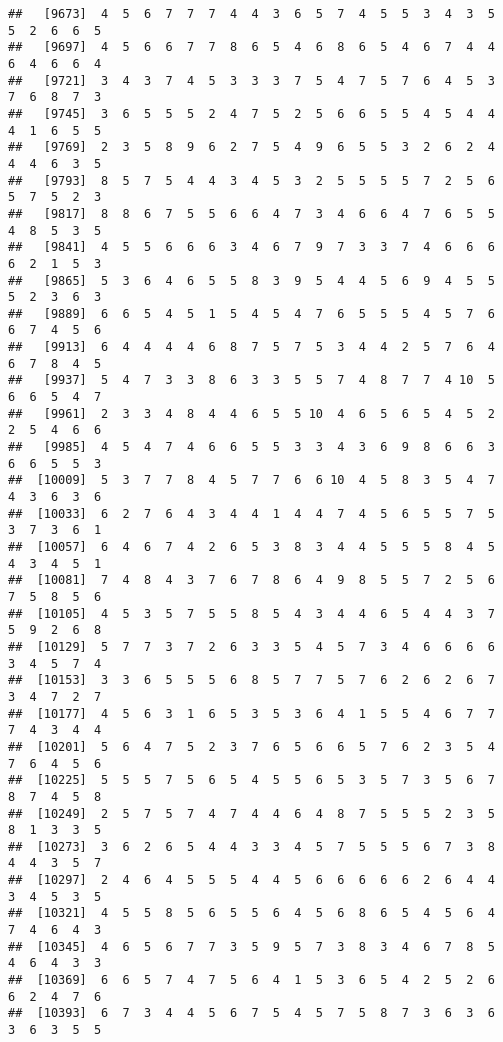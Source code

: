 \documentclass[
]{book}
\begin{document}
\begin{verbatim}
##   [9673]  4  5  6  7  7  7  4  4  3  6  5  7  4  5  5  3  4  3  5  5  2  6  6  5
##   [9697]  4  5  6  6  7  7  8  6  5  4  6  8  6  5  4  6  7  4  4  6  4  6  6  4
##   [9721]  3  4  3  7  4  5  3  3  3  7  5  4  7  5  7  6  4  5  3  7  6  8  7  3
##   [9745]  3  6  5  5  5  2  4  7  5  2  5  6  6  5  5  4  5  4  4  4  1  6  5  5
##   [9769]  2  3  5  8  9  6  2  7  5  4  9  6  5  5  3  2  6  2  4  4  4  6  3  5
##   [9793]  8  5  7  5  4  4  3  4  5  3  2  5  5  5  5  7  2  5  6  5  7  5  2  3
##   [9817]  8  8  6  7  5  5  6  6  4  7  3  4  6  6  4  7  6  5  5  4  8  5  3  5
##   [9841]  4  5  5  6  6  6  3  4  6  7  9  7  3  3  7  4  6  6  6  6  2  1  5  3
##   [9865]  5  3  6  4  6  5  5  8  3  9  5  4  4  5  6  9  4  5  5  5  2  3  6  3
##   [9889]  6  6  5  4  5  1  5  4  5  4  7  6  5  5  5  4  5  7  6  6  7  4  5  6
##   [9913]  6  4  4  4  4  6  8  7  5  7  5  3  4  4  2  5  7  6  4  6  7  8  4  5
##   [9937]  5  4  7  3  3  8  6  3  3  5  5  7  4  8  7  7  4 10  5  6  6  5  4  7
##   [9961]  2  3  3  4  8  4  4  6  5  5 10  4  6  5  6  5  4  5  2  2  5  4  6  6
##   [9985]  4  5  4  7  4  6  6  5  5  3  3  4  3  6  9  8  6  6  3  6  6  5  5  3
##  [10009]  5  3  7  7  8  4  5  7  7  6  6 10  4  5  8  3  5  4  7  4  3  6  3  6
##  [10033]  6  2  7  6  4  3  4  4  1  4  4  7  4  5  6  5  5  7  5  3  7  3  6  1
##  [10057]  6  4  6  7  4  2  6  5  3  8  3  4  4  5  5  5  8  4  5  4  3  4  5  1
##  [10081]  7  4  8  4  3  7  6  7  8  6  4  9  8  5  5  7  2  5  6  7  5  8  5  6
##  [10105]  4  5  3  5  7  5  5  8  5  4  3  4  4  6  5  4  4  3  7  5  9  2  6  8
##  [10129]  5  7  7  3  7  2  6  3  3  5  4  5  7  3  4  6  6  6  6  3  4  5  7  4
##  [10153]  3  3  6  5  5  5  6  8  5  7  7  5  7  6  2  6  2  6  7  3  4  7  2  7
##  [10177]  4  5  6  3  1  6  5  3  5  3  6  4  1  5  5  4  6  7  7  7  4  3  4  4
##  [10201]  5  6  4  7  5  2  3  7  6  5  6  6  5  7  6  2  3  5  4  7  6  4  5  6
##  [10225]  5  5  5  7  5  6  5  4  5  5  6  5  3  5  7  3  5  6  7  8  7  4  5  8
##  [10249]  2  5  7  5  7  4  7  4  4  6  4  8  7  5  5  5  2  3  5  8  1  3  3  5
##  [10273]  3  6  2  6  5  4  4  3  3  4  5  7  5  5  5  6  7  3  8  4  4  3  5  7
##  [10297]  2  4  6  4  5  5  5  4  4  5  6  6  6  6  6  2  6  4  4  3  4  5  3  5
##  [10321]  4  5  5  8  5  6  5  5  6  4  5  6  8  6  5  4  5  6  4  7  4  6  4  3
##  [10345]  4  6  5  6  7  7  3  5  9  5  7  3  8  3  4  6  7  8  5  4  6  4  3  3
##  [10369]  6  6  5  7  4  7  5  6  4  1  5  3  6  5  4  2  5  2  6  6  2  4  7  6
##  [10393]  6  7  3  4  4  5  6  7  5  4  5  7  5  8  7  3  6  3  6  3  6  3  5  5

\end{verbatim}
\end{document}
